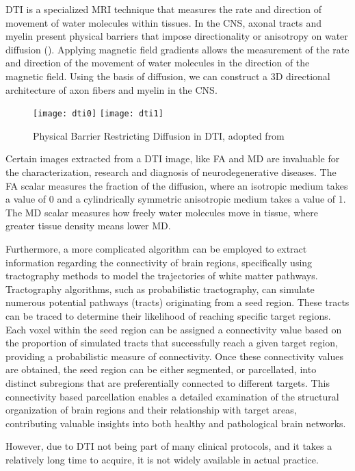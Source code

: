 \ac{DTI} is a specialized \ac{MRI} technique that measures the rate and direction of movement of water molecules within tissues. In the \ac{CNS}, axonal tracts and myelin present physical barriers that impose directionality or anisotropy on water diffusion (). Applying magnetic field gradients allows the measurement of the rate and direction of the movement of water molecules in the direction of the magnetic field. Using the basis of diffusion, we can construct a 3D directional architecture of axon fibers and myelin in the \ac{CNS}. \cite{dti}
\begin{figure}[H]
\centering
\texttt{[image: dti0]}
\texttt{[image: dti1]}
\caption{Physical Barrier Restricting Diffusion in \acs{DTI}, adopted from \cite{dti}}
\label{fig:dti}
\end{figure}
Certain images extracted from a \ac{DTI} image, like \ac{FA} and \ac{MD} are invaluable for the characterization, research and diagnosis of neurodegenerative diseases. The \ac{FA} scalar measures the fraction of the diffusion, where an isotropic medium takes a value of 0 and a cylindrically symmetric anisotropic medium takes a value of 1. The \ac{MD} scalar measures how freely water molecules move in tissue, where greater tissue density means lower \ac{MD}. \cite{rd}\par
Furthermore, a more complicated algorithm can be employed to extract information regarding the connectivity of brain regions, specifically using tractography methods to model the trajectories of white matter pathways. Tractography algorithms, such as probabilistic tractography, can simulate numerous potential pathways (tracts) originating from a seed region. These tracts can be traced to determine their likelihood of reaching specific target regions. Each voxel within the seed region can be assigned a connectivity value based on the proportion of simulated tracts that successfully reach a given target region, providing a probabilistic measure of connectivity. Once these connectivity values are obtained, the seed region can be either segmented, or parcellated, into distinct subregions that are preferentially connected to different targets. This connectivity based parcellation enables a detailed examination of the structural organization of brain regions and their relationship with target areas, contributing valuable insights into both healthy and pathological brain networks. \cite{tract} \cite{tract2}\par
However, due to \ac{DTI} not being part of many clinical protocols, and it takes a relatively long time to acquire, it is not widely available in actual practice.

